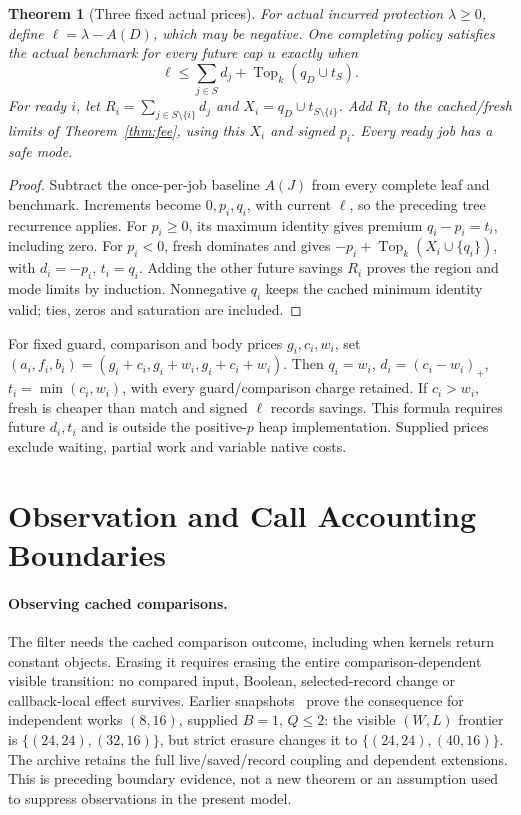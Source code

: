 \documentclass[acmsmall,screen,review,anonymous]{acmart}
\newtheorem{theorem}{Theorem}
\begin{document}
\begin{theorem}[Three fixed actual prices]
\label{thm:threeprices}
For actual incurred protection $\lambda\ge0$, define $\ell=\lambda-A(D)$, which may be negative. One completing policy satisfies the actual benchmark for every future cap $u$ exactly when
\begin{equation}
 \ell\le \sum_{j\in S}d_j+\operatorname{Top}_k(q_D\cup t_S).
 \label{eq:threeprices}
\end{equation}
For ready $i$, let $R_i=\sum_{j\in S\setminus\{i\}}d_j$ and $X_i=q_D\cup t_{S\setminus\{i\}}$. Add $R_i$ to the cached/fresh limits of Theorem~\ref{thm:fee}, using this $X_i$ and signed $p_i$. Every ready job has a safe mode.
\end{theorem}
\begin{proof}
Subtract the once-per-job baseline $A(J)$ from every complete leaf and benchmark. Increments become $0,p_i,q_i$, with current $\ell$, so the preceding tree recurrence applies. For $p_i\ge0$, its maximum identity gives premium $q_i-p_i=t_i$, including zero. For $p_i<0$, fresh dominates and gives $-p_i+\operatorname{Top}_k(X_i\cup\{q_i\})$, with $d_i=-p_i$, $t_i=q_i$. Adding the other future savings $R_i$ proves the region and mode limits by induction. Nonnegative $q_i$ keeps the cached minimum identity valid; ties, zeros and saturation are included.
\end{proof}

For fixed guard, comparison and body prices $g_i,c_i,w_i$, set $(a_i,f_i,b_i)=(g_i+c_i,g_i+w_i,g_i+c_i+w_i)$. Then $q_i=w_i$, $d_i=(c_i-w_i)_+$, $t_i=\min(c_i,w_i)$, with every guard/comparison charge retained. If $c_i>w_i$, fresh is cheaper than match and signed $\ell$ records savings. This formula requires future $d_i,t_i$ and is outside the positive-$p$ heap implementation. Supplied prices exclude waiting, partial work and variable native costs.


\section{Observation and Call Accounting Boundaries}
\label{sec:boundaries}

\paragraph{Observing cached comparisons.}
\label{sec:observation}
The filter needs the cached comparison outcome, including when kernels return constant objects. Erasing it requires erasing the entire comparison-dependent visible transition: no compared input, Boolean, selected-record change or callback-local effect survives. Earlier snapshots~\cite{chargedartifact} prove the consequence for independent works $(8,16)$, supplied $B=1$, $Q\le2$: the visible $(W,L)$ frontier is $\{(24,24),(32,16)\}$, but strict erasure changes it to $\{(24,24),(40,16)\}$. The archive retains the full live/saved/record coupling and dependent extensions. This is preceding boundary evidence, not a new theorem or an assumption used to suppress observations in the present model.
\end{document}
